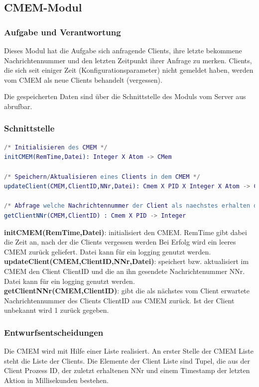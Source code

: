\documentclass{article}
\begin{document}
\newpage

\subsection{CMEM-Modul}
\subsubsection{Aufgabe und Verantwortung}
Dieses Modul hat die Aufgabe sich anfragende Clients, ihre letzte bekommene Nachrichtennummer und den letzten Zeitpunkt ihrer Anfrage zu merken.
Clients, die sich seit einiger Zeit (Konfigurationsparameter) nicht gemeldet haben, werden vom CMEM als neue Clients behandelt (vergessen).

Die gespeicherten Daten sind über die Schnittstelle des Moduls vom Server aus abrufbar.

\subsubsection{Schnittstelle}
\begin{lstlisting}[language=erlang]
/* Initialisieren des CMEM */
initCMEM(RemTime,Datei): Integer X Atom -> CMem

/* Speichern/Aktualisieren eines Clients in dem CMEM */
updateClient(CMEM,ClientID,NNr,Datei): Cmem X PID X Integer X Atom -> CMem

/* Abfrage welche Nachrichtennummer der Client als naechstes erhalten darf */
getClientNNr(CMEM,ClientID) : Cmem X PID -> Integer
\end{lstlisting}

\textbf{initCMEM(RemTime,Datei)}: initialisiert den CMEM. RemTime gibt dabei die Zeit an, nach der die Clients vergessen werden Bei Erfolg wird ein leeres CMEM zurück geliefert. Datei kann für ein logging genutzt werden.\\

\textbf{updateClient(CMEM,ClientID,NNr,Datei)}: speichert bzw. aktualisiert im CMEM den Client ClientID und die an ihn gesendete Nachrichtenummer NNr. Datei kann für ein logging genutzt werden.\\

\textbf{getClientNNr(CMEM,ClientID)}: gibt die als nächstes vom Client erwartete Nachrichtennummer des Clients ClientID aus CMEM zurück. Ist der Client unbekannt wird 1 zurück gegeben.\\

\subsubsection{Entwurfsentscheidungen}
Die CMEM wird mit Hilfe einer Liste realisiert. An erster Stelle der CMEM Liste steht die Liste der Clients. Die Elemente der Client Liste sind Tupel, die aus der Client Prozess ID, der zuletzt erhaltenen NNr und einem Timestamp der letzten Aktion in Millisekunden bestehen.
\end{document}
